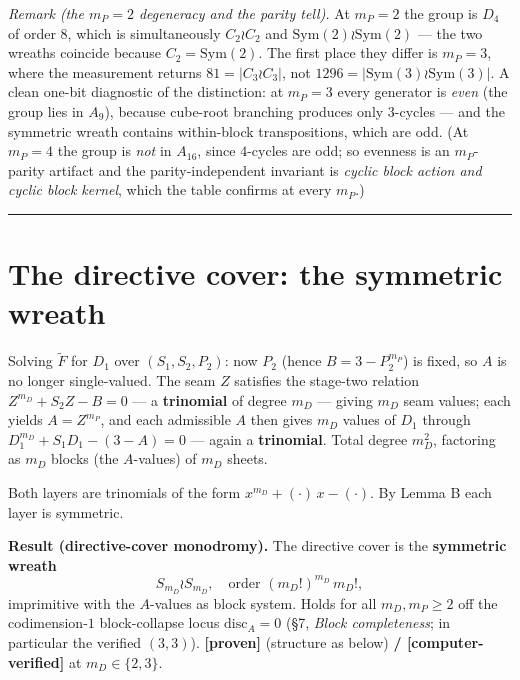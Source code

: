 \documentclass[11pt]{article}
\theoremstyle{plain}
\theoremstyle{definition}
\theoremstyle{remark}
\begin{document}
\emph{Remark (the \(m_P=2\) degeneracy and the parity tell).} At \(m_P=2\) the group is \(D_4\) of order \(8\), which is simultaneously \(C_2\wr C_2\) and \(\mathrm{Sym}(2)\wr\mathrm{Sym}(2)\) --- the two wreaths coincide because \(C_2 = \mathrm{Sym}(2)\). The first place they differ is \(m_P=3\), where the measurement returns \(81 = |C_3\wr C_3|\), not \(1296 = |\mathrm{Sym}(3)\wr\mathrm{Sym}(3)|\). A clean one-bit diagnostic of the distinction: at \(m_P=3\) every generator is \emph{even} (the group lies in \(A_9\)), because cube-root branching produces only \(3\)-cycles --- and the symmetric wreath contains within-block transpositions, which are odd. (At \(m_P=4\) the group is \emph{not} in \(A_{16}\), since \(4\)-cycles are odd; so evenness is an \(m_P\)-parity artifact and the parity-independent invariant is \emph{cyclic block action and cyclic block kernel}, which the table confirms at every \(m_P\).)

\begin{center}\rule{0.5\linewidth}{0.5pt}\end{center}

\hypertarget{the-directive-cover-the-symmetric-wreath}{%
\section{The directive cover: the symmetric wreath}\label{the-directive-cover-the-symmetric-wreath}}

Solving \(\widetilde F\) for \(D_1\) over \((S_1,S_2,P_2)\): now \(P_2\) (hence \(B = 3 - P_2^{m_P}\)) is fixed, so \(A\) is no longer single-valued. The seam \(Z\) satisfies the stage-two relation \(Z^{m_D} + S_2 Z - B = 0\) --- a \textbf{trinomial} of degree \(m_D\) --- giving \(m_D\) seam values; each yields \(A = Z^{m_P}\), and each admissible \(A\) then gives \(m_D\) values of \(D_1\) through \(D_1^{m_D} + S_1 D_1 - (3-A) = 0\) --- again a \textbf{trinomial}. Total degree \(m_D^2\), factoring as \(m_D\) blocks (the \(A\)-values) of \(m_D\) sheets.

Both layers are trinomials of the form \(x^{m_D} + (\cdot)\,x - (\cdot)\). By Lemma B each layer is symmetric.

\textbf{Result (directive-cover monodromy).} The directive cover is the \textbf{symmetric wreath} \[
\boxed{\;S_{m_D}\wr S_{m_D}, \quad \text{order } (m_D!)^{m_D}\,m_D!,\;}
\] imprimitive with the \(A\)-values as block system. Holds for all \(m_D, m_P \ge 2\) off the codimension-\(1\) block-collapse locus \(\mathrm{disc}_A=0\) (§7, \emph{Block completeness}; in particular the verified \((3,3)\)). \textbf{{[}proven{]}} (structure as below) \textbf{/ {[}computer-verified{]}} at \(m_D \in \{2,3\}\).
\end{document}
